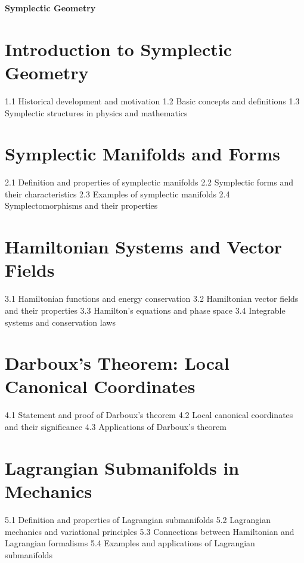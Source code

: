 {\LARGE \bf{Symplectic Geometry}}
\section{Introduction to Symplectic Geometry}
1.1 Historical development and motivation
1.2 Basic concepts and definitions
1.3 Symplectic structures in physics and mathematics
\section{Symplectic Manifolds and Forms}
2.1 Definition and properties of symplectic manifolds
2.2 Symplectic forms and their characteristics
2.3 Examples of symplectic manifolds
2.4 Symplectomorphisms and their properties
\section{Hamiltonian Systems and Vector Fields}
3.1 Hamiltonian functions and energy conservation
3.2 Hamiltonian vector fields and their properties
3.3 Hamilton's equations and phase space
3.4 Integrable systems and conservation laws
\section{Darboux's Theorem: Local Canonical Coordinates}
4.1 Statement and proof of Darboux's theorem
4.2 Local canonical coordinates and their significance
4.3 Applications of Darboux's theorem
\section{Lagrangian Submanifolds in Mechanics}
5.1 Definition and properties of Lagrangian submanifolds
5.2 Lagrangian mechanics and variational principles
5.3 Connections between Hamiltonian and Lagrangian formalisms
5.4 Examples and applications of Lagrangian submanifolds
